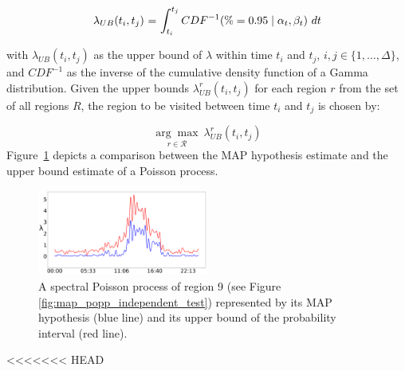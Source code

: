 \begin{equation}
	\label{eq:upper_bound_exploration}
	\begin{tabular}{r@{ = }l}
	$\lambda_{UB}(t_i, t_j)$ & $\displaystyle \int_{t_i}^{t_j} CDF^{-1}(\% = 0.95 \mid \alpha_t, \beta_t)~dt$\\ [1ex]
	\end{tabular}
\end{equation}

\noindent with $\lambda_{UB}(t_i, t_j)$ as the upper bound of $\lambda$ within time $t_i$ and $t_j$, $i, j \in \{1, \ldots, \Delta\}$, and $CDF^{-1}$ as the inverse of the cumulative density function of a Gamma distribution. Given the upper bounds $\lambda^{r}_{UB}(t_i, t_j)$ for each region $r$ from the set of all regions $R$, the region to be visited between time $t_i$ and $t_j$ is chosen by:

\begin{equation}
\label{eq:choosing_place}
\underset{r \in \mathcal R}{\arg\max}~\lambda^{r}_{UB}(t_i, t_j)
\end{equation}
\noindent Figure~\ref{fig:map_vs_ub} depicts a comparison between the MAP hypothesis estimate and the upper bound estimate of a Poisson process.

\begin{figure}[t!]
	\centering
	\includegraphics[width=0.5\textwidth]{./figures/map_vs_ub.png}
	\caption{A spectral Poisson process of region 9 (see Figure \ref{fig:map_popp_independent_test}) represented by its MAP hypothesis (blue line) and its upper bound of the probability interval (red line).}
	\label{fig:map_vs_ub}
\end{figure}

<<<<<<< HEAD

